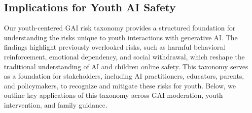



\vspace{-8pt}
\subsection{Implications for Youth AI Safety}
\vspace{-3pt}
Our youth-centered GAI risk taxonomy provides a structured foundation for understanding the risks unique to youth interactions with generative AI. The findings highlight previously overlooked risks, such as harmful behavioral reinforcement, emotional dependency, and social withdrawal, which reshape the traditional understanding of AI and children online safety. This taxonomy serves as a foundation for stakeholders, including AI practitioners, educators, parents, and policymakers, to recognize and mitigate these risks for youth. Below, we outline key applications of this taxonomy across GAI moderation, youth intervention, and family guidance.



